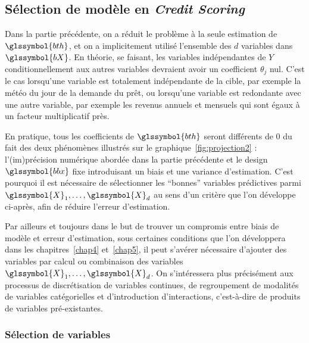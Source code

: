 \subsection{Sélection de modèle en \textit{Credit Scoring}}

Dans la partie précédente, on a réduit le problème à la seule estimation de $\glssymbol{bth}$, et on a implicitement utilisé l'ensemble des $d$ variables dans $\glssymbol{bX}$. En théorie, se faisant, les variables indépendantes de $Y$ conditionnellement aux autres variables devraient avoir un coefficient $\theta_j$ nul. C'est le cas lorsqu'une variable est totalement indépendante de la cible, par exemple la météo du jour de la demande du prêt, ou lorsqu'une variable est redondante avec une autre variable, par exemple les revenus annuels et mensuels qui sont égaux à un facteur multiplicatif près.

En pratique, tous les coefficients de $\glssymbol{bth}$ seront différents de $0$ du fait des deux phénomènes illustrés sur le graphique~\ref{fig:projection2} : l'(im)précision numérique abordée dans la partie précédente et le design $\glssymbol{bbx}$ fixe introduisant un biais et une variance d'estimation. C'est pourquoi il est nécessaire de sélectionner les ``bonnes'' variables prédictives parmi $\glssymbol{X}_1,\dots,\glssymbol{X}_d$ au sens d'un critère que l'on développe ci-après, afin de réduire l'erreur d'estimation.

Par ailleurs et toujours dans le but de trouver un compromis entre biais de modèle et erreur d'estimation, sous certaines conditions que l'on développera dans les chapitres~\ref{chap4} et~\ref{chap5}, il peut s'avérer nécessaire d'ajouter des variables par calcul ou combinaison des variables $\glssymbol{X}_1,\dots,\glssymbol{X}_d$. On s'intéressera plus précisément aux processus de discrétisation de variables continues, de regroupement de modalités de variables catégorielles et d'introduction d'interactions, c'est-à-dire de produits de variables pré-existantes. 

\subsubsection{Sélection de variables} \label{subsubsec:selection}

